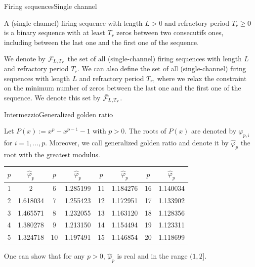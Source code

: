 \documentclass{beamer}
\begin{document}
	\begin{frame}{Firing sequences}{Single channel}
		\justifying
		\begin{definition}
			\justifying
			A (single channel) firing sequence with length $L > 0$ and refractory period $T_r \geq 0$ is a binary sequence with at least $T_r$ zeros between two consecutifs ones, including between the last one and the first one of the sequence.
		\end{definition}

		We denote by $\mathcal{F}_{L, T_r}$ the set of all (single-channel) firing sequences with length $L$ and refractory period $T_r$. 
		We can also define the set of all (single-channel) firing sequences with length $L$ and refractory period $T_r$, where we relax the constraint on the minimum number of zeros between the last one and the first one of the sequence. We denote this set by $\mathcal{\tilde{F}}_{L, T_r}$. 

	\end{frame}

	\begin{frame}{Intermezzio}{Generalized golden ratio}
		\justifying
		\begin{definition}
			\justifying
			Let $P(x) := x^p - x^{p-1} - 1$ with $p > 0$. The roots of $P(x)$ are denoted by $\varphi_{p, i}$ for $i = 1, \dots, p$. Moreover, we call generalized golden ratio and denote it by $\hat{\varphi}_p$ the root with the greatest modulus.
		\end{definition}
		
		\begin{table}
			\centering
			\begin{tabular}{*{8}{c}}
				\toprule
				$p$ & $\hat{\varphi}_p$ & $p$ & $\hat{\varphi}_p$ & $p$ & $\hat{\varphi}_p$ & $p$ & $\hat{\varphi}_p$ \\
				\midrule
				1 & 2 & 6 & 1.285199 & 11 & 1.184276 & 16 & 1.140034 \\
				2 & 1.618034 & 7 & 1.255423 & 12 & 1.172951 & 17 & 1.133902 \\
				3 & 1.465571 & 8 & 1.232055 & 13 & 1.163120 & 18 & 1.128356 \\
				4 & 1.380278 & 9 & 1.213150 & 14 & 1.154494 & 19 & 1.123311 \\
				5 & 1.324718 & 10 & 1.197491 & 15 & 1.146854 & 20 & 1.118699 \\
				\bottomrule
			\end{tabular}
		\end{table}

		One can show that for any $p > 0$, $\hat{\varphi}_p$ is real and in the range $(1, 2]$.
	\end{frame}
\end{document}
